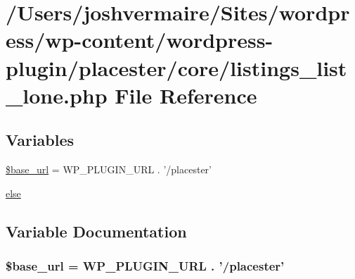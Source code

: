 \hypertarget{listings__list__lone_8php}{
\section{/Users/joshvermaire/Sites/wordpress/wp-\/content/wordpress-\/plugin/placester/core/listings\_\-list\_\-lone.php File Reference}
\label{df/d33/listings__list__lone_8php}
}
\subsection*{Variables}
\begin{DoxyCompactItemize}
\item 
\hyperlink{listings__list__lone_8php_a6886427c9c643f707fcb35c018049bc7}{\$base\_\-url} = WP\_\-PLUGIN\_\-URL . '/placester'
\item 
\hyperlink{listings__list__lone_8php_a0544c3fe466e421738dae463968b70ba}{else}
\end{DoxyCompactItemize}


\subsection{Variable Documentation}
\hypertarget{listings__list__lone_8php_a6886427c9c643f707fcb35c018049bc7}{
\subsubsection[{\$base\_\-url}]{\setlength{\rightskip}{0pt plus 5cm}\$base\_\-url = WP\_\-PLUGIN\_\-URL . '/placester'}}
\label{df/d33/listings__list__lone_8php_a6886427c9c643f707fcb35c018049bc7}
\hypertarget{listings__list__lone_8php_a0544c3fe466e421738dae463968b70ba}{
\subsubsection[{else}]{}}
\label{df/d33/listings__list__lone_8php_a0544c3fe466e421738dae463968b70ba}
